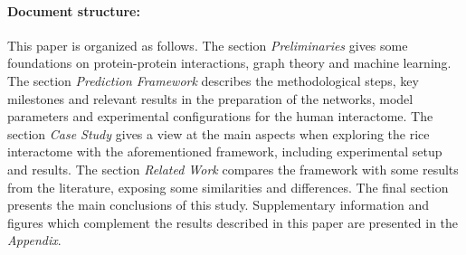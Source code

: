 \paragraph*{Document structure:} This paper is organized as follows. The 
section \emph{Preliminaries} gives some foundations on protein-protein 
interactions, graph theory and machine learning. The section 
\emph{Prediction Framework} describes the methodological steps, key 
milestones and relevant results in the preparation of the networks, 
model parameters and experimental configurations for the human
interactome. The section \emph{Case Study} gives a view at the main 
aspects when exploring the rice interactome with the aforementioned 
framework, including experimental setup and results. The section 
\emph{Related Work} compares the framework with some results from the literature, 
exposing some similarities and differences. The final section presents the 
main conclusions of this study. Supplementary information and figures which 
complement the results described in this paper  are presented in the 
\emph{Appendix}.